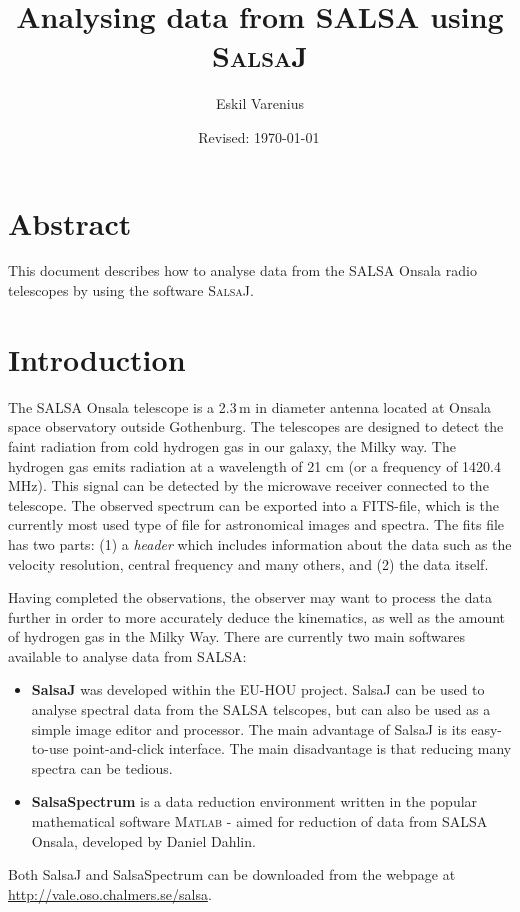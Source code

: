 \documentclass[11pt,a4paper]{article}
\begin{document}
\pagestyle{plain}
\title{\textsf{Analysing data from SALSA using \textsc{SalsaJ}}}
\author{\textsf{Eskil Varenius}}
\yyyymmdddate
\date{\textsf{Revised: \today \, \currenttime}}
 

\maketitle

\section*{Abstract}
This document describes how to analyse data from the SALSA Onsala radio 
telescopes by using the software \textsc{SalsaJ}. 

\tableofcontents

\section{Introduction}
\label{sec:introduction}

The SALSA Onsala telescope is a 2.3\,m in diameter antenna located at
Onsala space observatory outside Gothenburg. The telescopes are
designed to detect the faint radiation from cold hydrogen gas in our
galaxy, the Milky way. The hydrogen gas emits radiation at a
wavelength of 21 cm (or a frequency of 1420.4 MHz). This signal can be
detected by the microwave receiver connected to the telescope. 
The observed spectrum can be
exported into a FITS-file, which is the currently most used type of
file for astronomical images and spectra. The fits file has two parts:
(1) a \emph{header} which includes information
about the data such as the velocity resolution, central frequency and
many others, and (2) the data itself.

Having completed the observations, the observer may want to process
the data further in order to more accurately deduce the kinematics,
as well as the amount of hydrogen gas in the Milky Way. There
are currently two main softwares available to analyse data from SALSA:

\begin{itemize}
\item \textbf{SalsaJ} was developed within the EU-HOU project.
	SalsaJ can be used to analyse spectral data from the SALSA telscopes, but
	can also be used as a simple image editor and processor.  The main
	advantage of SalsaJ is its easy-to-use point-and-click interface. The main
	disadvantage is that reducing many spectra can be tedious.
\item \textbf{SalsaSpectrum} is a data reduction environment written
  in the popular mathematical software \textsc{\textsc{Matlab}} -
  aimed for reduction of data from SALSA Onsala, developed by Daniel
  Dahlin. 
\end{itemize}
Both SalsaJ and SalsaSpectrum can be downloaded from the webpage at
{\url{http://vale.oso.chalmers.se/salsa}}. 
\end{document}
